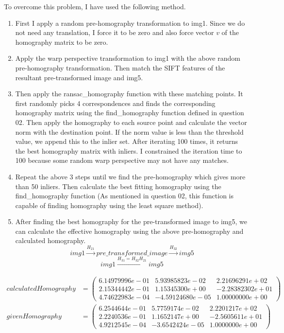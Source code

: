 \documentclass[a4paper]{article}
\begin{document}
To overcome this problem, I have used the following method.
\begin{enumerate}
  \item First I apply a random pre-homography
   transformation to img1. Since we do not need
    any translation, I force it to be zero and
     also force vector $v$ of the homography matrix to be zero.
  \item Apply the warp perspective transformation to img1 with
   the above random pre-homography transformation. Then match
    the SIFT features of the resultant pre-transformed image 
    and img5.
  \item Then apply the ransac\_homography function with these matching
   points. It first randomly picks 4 correspondences and finds the
    corresponding homography matrix using the find\_homography
     function defined in question 02. Then apply the homography
      to each source point and calculate the vector norm with
       the destination point. If the norm value is less than
        the threshold value, we append this to the inlier set.
         After iterating 100 times, it returns the best homography
          matrix with inliers. I constrained the iteration time to 
          100 because some random warp perspective may not have
           any matches.
  \item Repeat the above 3 steps until we find the pre-homography
   which gives more than 50 inliers. Then calculate the best fitting
    homography using the find\_homography function 
    (As mentioned in question 02, this function is capable
     of finding homography using the least square method).
  \item After finding the best homography
   for the pre-transformed image to img5,
    we can calculate the effective homography using
     the above pre-homography and calculated homography.
     $$img1 \xrightarrow{H_{21}} pre\_transformed\_image \xrightarrow{H_{32}} img5$$
     $$img1 \xrightarrow{H_{31}=H_{32}H_{21}}  img5$$
\end{enumerate}
\begin{align*}
  calculatedHomography&=
  \begin{pmatrix}
     6.14979996e-01&  5.93985823e-02 & 2.21696291e+02\\
     2.15344442e-01  &1.15345300e+00 &-2.28382302e+01\\
  4.74622983e-04 &-4.59124680e-05&  1.00000000e+00
  \end{pmatrix} \\ givenHomography&=
  \begin{pmatrix}
    6.2544644e-01 &  5.7759174e-02 &  2.2201217e+02\\
    2.2240536e-01 &  1.1652147e+00 & -2.5605611e+01\\
    4.9212545e-04 & -3.6542424e-05 &  1.0000000e+00
  \end{pmatrix}
\end{align*}
\end{document}
